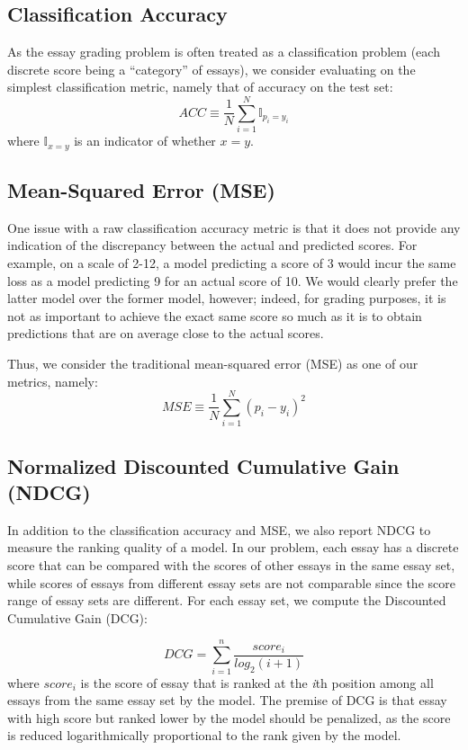 \documentclass[10pt,psamsfonts]{amsart}
\theoremstyle{definition}
\theoremstyle{remark}
\numberwithin{equation}{section}
\begin{document}
\subsection*{Classification Accuracy}

As the essay grading problem is often treated as a classification problem (each discrete score being a ``category'' of essays), we consider evaluating on the simplest classification metric, namely that of accuracy on the test set:
$$ACC \equiv \frac{1}{N} \sum_{i=1}^N \mathbb{I}_{p_i = y_i}$$
where $\mathbb{I}_{x=y}$ is an indicator of whether $x=y$.

\subsection*{Mean-Squared Error (MSE)}

One issue with a raw classification accuracy metric is that it does not provide any indication of the discrepancy between the actual and predicted scores. For example, on a scale of 2-12, a model predicting a score of 3 would incur the same loss as a model predicting 9 for an actual score of 10. We would clearly prefer the latter model over the former model, however; indeed, for grading purposes, it is not as important to achieve the exact same score so much as it is to obtain predictions that are on average close to the actual scores.

Thus, we consider the traditional mean-squared error (MSE) as one of our metrics, namely:
$$MSE \equiv \frac{1}{N} \sum_{i=1}^N (p_i - y_i)^2$$

\subsection*{Normalized Discounted Cumulative Gain (NDCG)}

In addition to the classification accuracy and MSE, we also report NDCG to measure the ranking quality of a model. In our problem, each essay has a discrete score that can be compared with the scores of other essays in the same essay set, while scores of essays from different essay sets are not comparable since the score range of essay sets are different. For each essay set, we compute the Discounted Cumulative Gain (DCG):
 
$$DCG=\sum_{i=1}^n\frac{score_i}{log_2(i+1)}$$
where $score_i$ is the score of essay that is ranked at the \textit{i}th position among all essays from the same essay set by the model. The premise of DCG is that essay with high score but ranked lower by the model should be penalized, as the score is reduced logarithmically proportional to the rank given by the model.
\end{document}
